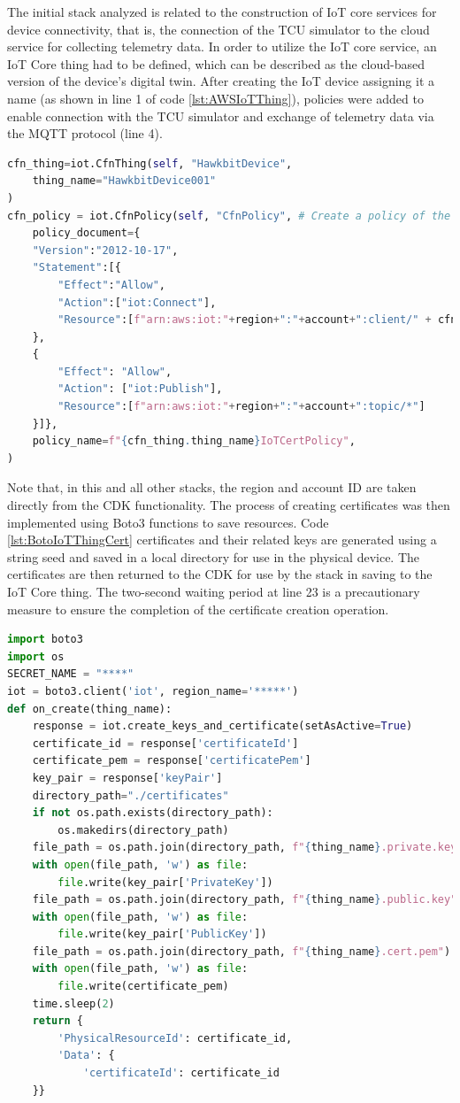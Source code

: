 The initial stack analyzed is related to the construction of IoT core services for device connectivity, that is, the connection of the TCU simulator to the cloud service for collecting telemetry data. In order to utilize the IoT core service, an IoT Core thing had to be defined, which can be described as the cloud-based version of the device's digital twin. After creating the IoT device assigning it a name (as shown in line 1 of code \ref{lst:AWSIoTThing}), policies were added to enable connection with the TCU simulator and exchange of telemetry data via the MQTT protocol (line 4).
\begin{lstlisting}[language=Python, caption={Code for the creation of IoT Core Thing and related policies}, label=lst:AWSIoTThing]
cfn_thing=iot.CfnThing(self, "HawkbitDevice",
    thing_name="HawkbitDevice001"
)
cfn_policy = iot.CfnPolicy(self, "CfnPolicy", # Create a policy of the certificate
    policy_document={
    "Version":"2012-10-17",
    "Statement":[{
        "Effect":"Allow",
        "Action":["iot:Connect"],
        "Resource":[f"arn:aws:iot:"+region+":"+account+":client/" + cfn_thing.thing_name]
    },
    {
        "Effect": "Allow",
        "Action": ["iot:Publish"],
        "Resource":[f"arn:aws:iot:"+region+":"+account+":topic/*"]
    }]},
    policy_name=f"{cfn_thing.thing_name}IoTCertPolicy",
)
\end{lstlisting}
Note that, in this and all other stacks, the region and account ID are taken directly from the CDK functionality.
The process of creating certificates was then implemented using Boto3 functions to save resources. Code \ref{lst:BotoIoTThingCert} certificates and their related keys are generated using a string seed and saved in a local directory for use in the physical device. The certificates are then returned to the CDK for use by the stack in saving to the IoT Core thing. The two-second waiting period at line 23 is a precautionary measure to ensure the completion of the certificate creation operation.
\begin{lstlisting}[language=Python, caption={Code for the creation of IoT Core Thing certificates and keys}, label=lst:BotoIoTThingCert]
import boto3
import os
SECRET_NAME = "****"
iot = boto3.client('iot', region_name='*****')
def on_create(thing_name):
    response = iot.create_keys_and_certificate(setAsActive=True)
    certificate_id = response['certificateId']
    certificate_pem = response['certificatePem']
    key_pair = response['keyPair']
    directory_path="./certificates"
    if not os.path.exists(directory_path):
        os.makedirs(directory_path)
    file_path = os.path.join(directory_path, f"{thing_name}.private.key")
    with open(file_path, 'w') as file:
        file.write(key_pair['PrivateKey'])
    file_path = os.path.join(directory_path, f"{thing_name}.public.key")
    with open(file_path, 'w') as file:
        file.write(key_pair['PublicKey'])
    file_path = os.path.join(directory_path, f"{thing_name}.cert.pem")
    with open(file_path, 'w') as file:
        file.write(certificate_pem)
    time.sleep(2)
    return {
        'PhysicalResourceId': certificate_id,
        'Data': {
            'certificateId': certificate_id
    }}
\end{lstlisting}

